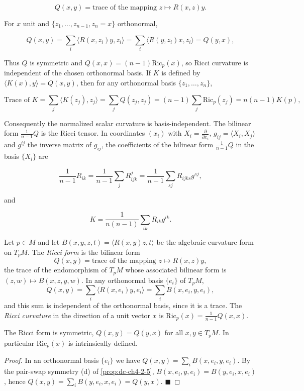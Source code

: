 $$
Q(x,y)=\text{trace of the mapping }z\mapsto R(x,z)y.
$$

For $x$ unit and $\{z_1,\dots,z_{n-1},z_n=x\}$ orthonormal,

$$
Q(x,y)=\sum_i\langle R(x,z_i)y,z_i\rangle=\sum_i\langle R(y,z_i)x,z_i\rangle=Q(y,x),
$$

Thus $Q$ is symmetric and $Q(x,x)=(n-1)\mathrm{Ric}_p(x)$, so Ricci curvature is
independent of the chosen orthonormal basis. If $K$ is defined by
$\langle K(x),y\rangle=Q(x,y)$, then for any orthonormal basis
$\{z_1,\dots,z_n\}$,

$$
\text{Trace of }K=\sum_j\langle K(z_j),z_j\rangle=\sum_j Q(z_j,z_j)=(n-1)\sum_j\mathrm{Ric}_p(z_j)=n(n-1)K(p),
$$

Consequently the normalized scalar curvature is basis-independent. The bilinear
form $\frac{1}{n-1}Q$ is the Ricci tensor. In coordinates $(x_i)$ with
$X_i=\frac{\partial}{\partial x_i}$, $g_{ij}=\langle X_i,X_j\rangle$ and $g^{ij}$
the inverse matrix of $g_{ij}$, the coefficients of the bilinear form
$\frac{1}{n-1}Q$ in the basis $\{X_i\}$ are

$$
\frac{1}{n-1}R_{ik}=\frac{1}{n-1}\sum_j R_{ijk}^j=\frac{1}{n-1}\sum_{sj}R_{ijks}g^{sj},
$$

and

$$
K=\frac{1}{n(n-1)}\sum_{ik}R_{ik}g^{ik}.
$$

\begin{definition}
  \label{def:dc-ch4-4-ricci-form}
  \leanok
  Let $p\in M$ and let $B(x,y,z,t)=\langle R(x,y)z,t\rangle$ be the algebraic
  curvature form on $T_pM$. The \emph{Ricci form} is the bilinear form
  $$
  Q(x,y)=\text{trace of the mapping }z\mapsto R(x,z)y,
  $$
  the trace of the endomorphism of $T_pM$ whose associated bilinear form is
  $(z,w)\mapsto B(x,z,y,w)$. In any orthonormal basis $\{e_i\}$ of $T_pM$,
  $$
  Q(x,y)=\sum_i\langle R(x,e_i)y,e_i\rangle=\sum_i B(x,e_i,y,e_i),
  $$
  and this sum is independent of the orthonormal basis, since it is a trace. The
  \emph{Ricci curvature} in the direction of a unit vector $x$ is
  $\mathrm{Ric}_p(x)=\frac{1}{n-1}Q(x,x)$.
\end{definition}

\begin{proposition}
  \label{prop:dc-ch4-4-ricci-symm}
  \leanok
  The Ricci form is symmetric, $Q(x,y)=Q(y,x)$ for all $x,y\in T_pM$. In
  particular $\mathrm{Ric}_p(x)$ is intrinsically defined.
\end{proposition}
\begin{proof}
  \leanok
  \sketch
  In an orthonormal basis $\{e_i\}$ we have $Q(x,y)=\sum_i B(x,e_i,y,e_i)$. By the
  pair-swap symmetry (d) of \cref{prop:dc-ch4-2-5}, $B(x,e_i,y,e_i)=B(y,e_i,x,e_i)$,
  hence $Q(x,y)=\sum_i B(y,e_i,x,e_i)=Q(y,x)$. $\blacksquare$
\end{proof}


